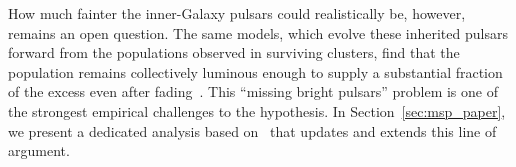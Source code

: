 How much fainter the inner-Galaxy pulsars could realistically be, however, remains an open question. The same models, which evolve these inherited pulsars forward from the populations observed in surviving clusters, find that the population remains collectively luminous enough to supply a substantial fraction of the excess even after fading~\cite{Fragione:2017rsp,Ye:2022yxt}.
This ``missing bright pulsars'' problem is one of the strongest empirical challenges to the \MSP hypothesis.
In Section~\ref{sec:msp_paper}, we present a dedicated analysis based on~\cite{Amerio:2024qor} that updates and extends this line of argument.